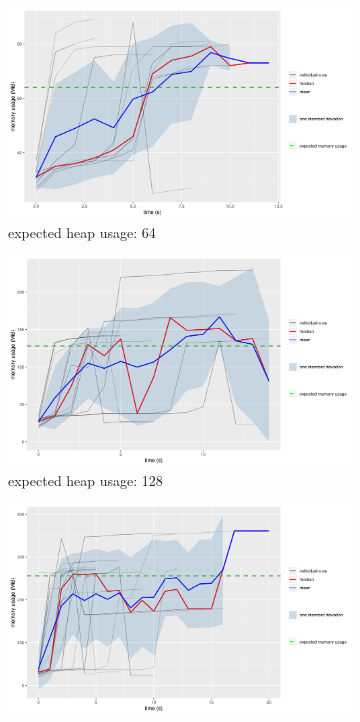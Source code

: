 \documentclass{article}
\begin{document}
\begin{figure}
  \centering
  \begin{subfigure}[t]{0.49\textwidth}
    \centering
    \includegraphics[width=\textwidth]{../plots/heap_64.png}
    \caption{expected heap usage: \SI{64}{\mebi\byte}}
    \label{fig:heap_64}
  \end{subfigure}
  \begin{subfigure}[t]{0.49\textwidth}
    \centering
    \includegraphics[width=\textwidth]{../plots/heap_128.png}
    \caption{expected heap usage: \SI{128}{\mebi\byte}}
    \label{fig:heap_128}
  \end{subfigure}
  \begin{subfigure}[t]{0.49\textwidth}
    \centering
    \includegraphics[width=\textwidth]{../plots/heap_256.png}

\end{subfigure}
\end{figure}
\end{document}
